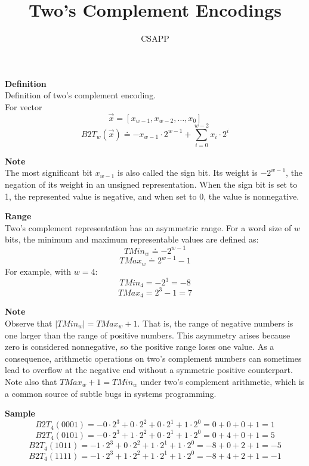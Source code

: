 \documentclass{article}
\title{Two's Complement Encodings}
\author{CSAPP}
\begin{document}
\maketitle
\begin{flushleft}
\textbf{Definition}\\
    Definition of two's complement encoding.\\
    For vector
    \[\vec{x} = [x_{w-1}, x_{w-2}, \ldots, x_{0}]\]
    \[B2T_w(\vec{x}) \doteq -x_{w-1} \cdot 2^{w-1} + \sum_{i=0}^{w-2} x_{i} \cdot 2^{i}\]

\textbf{Note}\\
    The most significant bit $x_{w-1}$ is also called the sign bit. Its
    weight is $-2^{w-1}$, the negation of its weight in an unsigned representation.
    When the sign bit is set to 1, the represented value is negative, and when set to
    0, the value is nonnegative.

\smallskip
\textbf{Range}\\
    Two's complement representation has an asymmetric range. For a word size of $w$ bits,
    the minimum and maximum representable values are defined as:
    \[TMin_w \doteq -2^{w-1}\]
    \[TMax_w \doteq 2^{w-1} - 1\]
    For example, with $w = 4$:
    \[TMin_4 = -2^3 = -8\]
    \[TMax_4 = 2^3 - 1 = 7\]

\textbf{Note}\\
    Observe that $|TMin_w| = TMax_w + 1$. That is, the range of negative numbers is
    one larger than the range of positive numbers. This asymmetry arises because zero
    is considered nonnegative, so the positive range loses one value. As a consequence,
    arithmetic operations on two's complement numbers can sometimes lead to overflow
    at the negative end without a symmetric positive counterpart. Note also that
    $TMax_w + 1 = TMin_w$ under two's complement arithmetic, which is a common
    source of subtle bugs in systems programming.

\smallskip
\textbf{Sample}\\
    \[B2T_{4}(0001) = -0\cdot2^3 + 0\cdot2^2 + 0\cdot2^1 + 1\cdot2^0 = 0+0+0+1 = 1\]
    \[B2T_{4}(0101) = -0\cdot2^3 + 1\cdot2^2 + 0\cdot2^1 + 1\cdot2^0 = 0+4+0+1 = 5\]
    \[B2T_{4}(1011) = -1\cdot2^3 + 0\cdot2^2 + 1\cdot2^1 + 1\cdot2^0 = -8+0+2+1 = -5\]
    \[B2T_{4}(1111) = -1\cdot2^3 + 1\cdot2^2 + 1\cdot2^1 + 1\cdot2^0 = -8+4+2+1 = -1\]
\end{flushleft}
\end{document}
